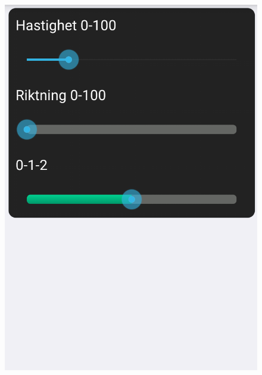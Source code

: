 \documentclass[a4paper]{article}
\begin{document}
\begin{figure}[H]
\includegraphics[scale=0.2]{applikation1.png}

\end{figure}
\end{document}
